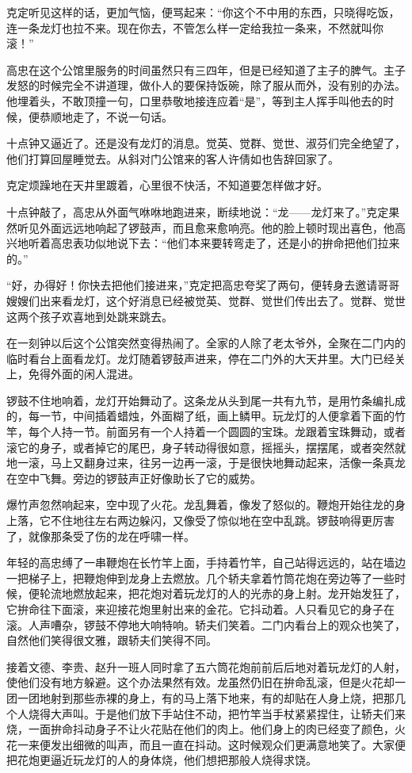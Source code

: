 \par 克定听见这样的话，更加气恼，便骂起来：“你这个不中用的东西，只晓得吃饭，连一条龙灯也拉不来。现在你去，不管怎么样一定给我拉一条来，不然就叫你滚！”
\par 高忠在这个公馆里服务的时间虽然只有三四年，但是已经知道了主子的脾气。主子发怒的时候完全不讲道理，做仆人的要保持饭碗，除了服从而外，没有别的办法。他埋着头，不敢顶撞一句，口里恭敬地接连应着“是”，等到主人挥手叫他去的时候，便恭顺地走了，不说一句话。
\par 十点钟又逼近了。还是没有龙灯的消息。觉英、觉群、觉世、淑芬们完全绝望了，他们打算回屋睡觉去。从斜对门公馆来的客人许倩如也告辞回家了。
\par 克定烦躁地在天井里踱着，心里很不快活，不知道要怎样做才好。
\par 十点钟敲了，高忠从外面气咻咻地跑进来，断续地说：“龙——龙灯来了。”克定果然听见外面远远地响起了锣鼓声，而且愈来愈响亮。他的脸上顿时现出喜色，他高兴地听着高忠表功似地说下去：“他们本来要转弯走了，还是小的拚命把他们拉来的。”
\par “好，办得好！你快去把他们接进来，”克定把高忠夸奖了两句，便转身去邀请哥哥嫂嫂们出来看龙灯，这个好消息已经被觉英、觉群、觉世们传出去了。觉群、觉世这两个孩子欢喜地到处跳来跳去。
\par 在一刻钟以后这个公馆突然变得热闹了。全家的人除了老太爷外，全聚在二门内的临时看台上面看龙灯。龙灯随着锣鼓声进来，停在二门外的大天井里。大门已经关上，免得外面的闲人混进。
\par 锣鼓不住地响着，龙灯开始舞动了。这条龙从头到尾一共有九节，是用竹条编扎成的，每一节，中间插着蜡烛，外面糊了纸，画上鳞甲。玩龙灯的人便拿着下面的竹竿，每个人持一节。前面另有一个人持着一个圆圆的宝珠。龙跟着宝珠舞动，或者滚它的身子，或者掉它的尾巴，身子转动得很如意，摇摇头，摆摆尾，或者突然就地一滚，马上又翻身过来，往另一边再一滚，于是很快地舞动起来，活像一条真龙在空中飞舞。旁边的锣鼓声正好像助长了它的威势。
\par 爆竹声忽然响起来，空中现了火花。龙乱舞着，像发了怒似的。鞭炮开始往龙的身上落，它不住地往左右两边躲闪，又像受了惊似地在空中乱跳。锣鼓响得更厉害了，就像那条受了伤的龙在呼啸一样。
\par 年轻的高忠缚了一串鞭炮在长竹竿上面，手持着竹竿，自己站得远远的，站在墙边一把梯子上，把鞭炮伸到龙身上去燃放。几个轿夫拿着竹筒花炮在旁边等了一些时候，便轮流地燃放起来，把花炮对着玩龙灯的人的光赤的身上射。龙开始发狂了，它拚命往下面滚，来迎接花炮里射出来的金花。它抖动着。人只看见它的身子在滚。人声嘈杂，锣鼓不停地大响特响。轿夫们笑着。二门内看台上的观众也笑了，自然他们笑得很文雅，跟轿夫们笑得不同。
\par 接着文德、李贵、赵升一班人同时拿了五六筒花炮前前后后地对着玩龙灯的人射，使他们没有地方躲避。这个办法果然有效。龙虽然仍旧在拚命乱滚，但是火花却一团一团地射到那些赤裸的身上，有的马上落下地来，有的却贴在人身上烧，把那几个人烧得大声叫。于是他们放下手站住不动，把竹竿当手杖紧紧捏住，让轿夫们来烧，一面拚命抖动身子不让火花贴在他们的肉上。他们身上的肉已经变了颜色，火花一来便发出细微的叫声，而且一直在抖动。这时候观众们更满意地笑了。大家便把花炮更逼近玩龙灯的人的身体烧，他们想把那般人烧得求饶。
